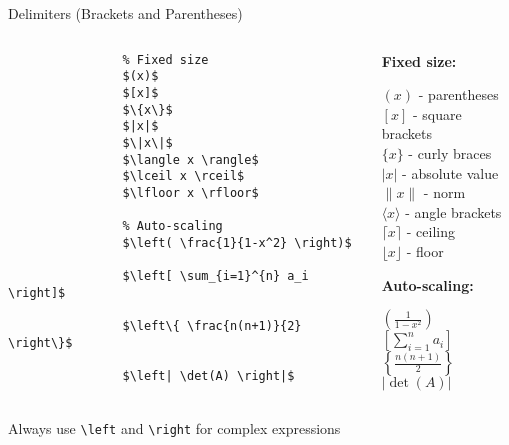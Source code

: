 \begin{frame}[fragile]{Delimiters (Brackets and Parentheses)}
    \begin{columns}
        \begin{column}{0.5\textwidth}
            \begin{lstlisting}
                % Fixed size
                $(x)$
                $[x]$
                $\{x\}$
                $|x|$
                $\|x\|$
                $\langle x \rangle$
                $\lceil x \rceil$
                $\lfloor x \rfloor$
                
                % Auto-scaling
                $\left( \frac{1}{1-x^2} \right)$
                
                $\left[ \sum_{i=1}^{n} a_i \right]$
                
                $\left\{ \frac{n(n+1)}{2} \right\}$
                
                $\left| \det(A) \right|$
            \end{lstlisting}
        \end{column}
        
        \begin{column}{0.5\textwidth}
            \textbf{Fixed size:}
            \begin{center}
                $(x)$ - parentheses\\
                $[x]$ - square brackets\\
                $\{x\}$ - curly braces\\
                $|x|$ - absolute value\\
                $\|x\|$ - norm\\
                $\langle x \rangle$ - angle brackets\\
                $\lceil x \rceil$ - ceiling\\
                $\lfloor x \rfloor$ - floor
            \end{center}
            
            \textbf{Auto-scaling:}
            \begin{center}
                $\left( \frac{1}{1-x^2} \right)$\\[5pt]
                $\left[ \sum_{i=1}^{n} a_i \right]$\\[5pt]
                $\left\{ \frac{n(n+1)}{2} \right\}$\\[5pt]
                $\left| \det(A) \right|$
            \end{center}
        \end{column}
    \end{columns}
    
    \begin{tip}
        Always use \texttt{\textbackslash left} and \texttt{\textbackslash right} for complex expressions
    \end{tip}
\end{frame}

